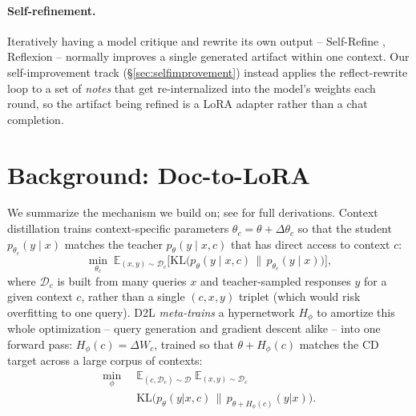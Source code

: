 \documentclass[11pt]{article}
\newcommand{\DTL}{D2L}
\begin{document}
\paragraph{Self-refinement.} Iteratively having a model critique and rewrite its own output -- Self-Refine \citep{madaan2023selfrefine}, Reflexion \citep{shinn2023reflexion} -- normally improves a single generated artifact within one context. Our self-improvement track (\S\ref{sec:selfimprovement}) instead applies the reflect-rewrite loop to a set of \emph{notes} that get re-internalized into the model's weights each round, so the artifact being refined is a LoRA adapter rather than a chat completion.

\section{Background: Doc-to-LoRA}
\label{sec:background}

We summarize the mechanism we build on; see \citet{charakorn2026doctolora} for full derivations. Context distillation trains context-specific parameters $\theta_c = \theta + \Delta\theta_c$ so that the student $p_{\theta_c}(y\mid x)$ matches the teacher $p_\theta(y\mid x, c)$ that has direct access to context $c$:
\begin{equation}
\min_{\theta_c}\; \mathbb{E}_{(x,y)\sim\mathcal{D}_c}\Big[\mathrm{KL}\big(p_\theta(y\mid x,c)\,\|\,p_{\theta_c}(y\mid x)\big)\Big],
\label{eq:cd}
\end{equation}
where $\mathcal{D}_c$ is built from many queries $x$ and teacher-sampled responses $y$ for a given context $c$, rather than a single $(c,x,y)$ triplet (which would risk overfitting to one query). \DTL{} \emph{meta-trains} a hypernetwork $H_\phi$ to amortize this whole optimization -- query generation and gradient descent alike -- into one forward pass: $H_\phi(c) = \Delta W_c$, trained so that $\theta+H_\phi(c)$ matches the CD target across a large corpus of contexts:
\begin{equation}
\begin{aligned}
\min_{\phi}\;\; &\mathbb{E}_{(c,\mathcal{D}_c)\sim\mathcal{D}}\; \mathbb{E}_{(x,y)\sim\mathcal{D}_c} \\[2pt]
&\mathrm{KL}\big(p_\theta(y|x,c)\,\|\,p_{\theta+H_\phi(c)}(y|x)\big).
\end{aligned}
\label{eq:meta}
\end{equation}
\end{document}
